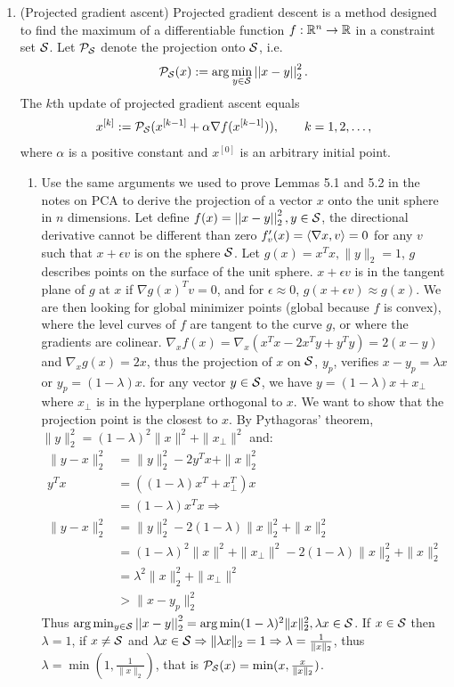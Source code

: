 \documentclass[12pt,twoside]{article}
\begin{document}
\begin{enumerate}
\item (Projected gradient ascent) Projected gradient descent is a method designed to find the maximum of a differentiable function $f:\mathbb{R}^n \rightarrow \mathbb{R}$ in a constraint set $\mathcal{ S }$. Let $\mathcal{ P }_{\mathcal{ S }}$ denote the projection onto $\mathcal{ S }$, i.e.
\begin{align}
\mathcal{ P }_{\mathcal{ S }}(x) := \arg \min_{y \in \mathcal{ S }} \left|\left| x-y \right|\right| _{2}^2.
\end{align} 
The $k$th update of projected gradient ascent equals
\begin{align}
x^{[k]} :=\mathcal{ P }_{\mathcal{ S }}( x^{[k-1]} + \alpha \nabla f (x^{[k-1]}) ), \qquad k=1,2,\ldots,
\end{align}
where $\alpha$ is a positive constant and $x^{[0]}$ is an arbitrary initial point.
\begin{enumerate}
\item Use the same arguments we used to prove Lemmas 5.1 and 5.2 in the notes on PCA to derive the projection of a vector $x$ onto the unit sphere in $n$ dimensions.
Let define $f(x) =  \left|\left| x-y \right|\right| _{2}^2,y \in \mathcal{ S }$, the directional derivative cannot be different than zero $f'_v(x) = \left \langle \nabla{x}, v\right \rangle = 0$ for any $v$ such that $x+ \epsilon v$ is on the sphere $\mathcal{ S }$. Let $g(x)=x^T x, \| y \|_2 = 1$, $g$ describes points on the surface of the unit sphere. $x +\epsilon v$ is in the tangent  plane of $g$ at $x$ if $\nabla{g(x)}^T v = 0$, and for $\epsilon \approx 0$, $g(x + \epsilon v) \approx g(x)$. We are then looking for global minimizer points (global because $f$ is convex), where the level curves of $f$ are tangent to the curve $g$, or where the gradients are colinear. $\nabla_x{f(x)} = \nabla_x{(x^T x -2 x^T y + y^T y)} = 2 (x-y)$ and $\nabla_x{g(x)} = 2 x$, thus the projection of $x$ on $\mathcal{ S }$, $y_p$, verifies $x -y_p = \lambda x$ or $y_p = (1- \lambda) x$. for any vector $y \in \mathcal{ S }$, we have $y = (1-\lambda) x + x_\bot$ where $x_\bot$ is in the hyperplane orthogonal to $x$. We want to show that the projection point is the closest to $x$.
	By Pythagoras’ theorem, $\|y\|_2^2 = (1-\lambda)^2 \|x\|^2 + \|x_\bot\|^2$ and:
	\begin{align*}
		\|y - x \|_2^2	&=	\|y\|_2^2 -2 y^T x + \| x \|_2^2 \\
		y^Tx			&=	((1-\lambda) x^T + x_\bot^T) x \\
					&=	(1-\lambda) x^T x \Rightarrow \\
		\|y - x \|_2^2	&=	\|y\|_2^2 - 2 (1-\lambda) \|x\|_2^2 + \| x\|_2^2 \\
					&= 	(1-\lambda)^2 \|x\|^2 + \|x_\bot\|^2  - 2 (1-\lambda) \|x\|_2^2 + \| x\|_2^2 \\
					&=	\lambda^2 \| x \|_2^2 + \|x_\bot\|^2 \\	
					&> \| x - y_p \|_2^2
	\end{align*}
	Thus  $\arg \min_{y \in \mathcal{ S }} \left|\left| x-y \right|\right| _{2}^2 =\arg \min  (1-\lambda)^2 \|x\|_2^2, \lambda x  \in \mathcal{ S }$. If $x \in  \mathcal{ S }$ then $\lambda = 1$, 
	if $x \neq \mathcal{ S }$ and $\lambda x  \in \mathcal{ S } \Rightarrow \|\lambda x \|_2 = 1 \Rightarrow \lambda = \frac{1}{\|x\|_2}$, thus $\lambda = \min(1,  \frac{1}{\|x\|_2})$,
	that is $\mathcal{ P }_{\mathcal{ S }}(x) = \min(x, \frac{x}{\|x\|_2})$.



\end{enumerate}
\end{enumerate}
\end{document}
